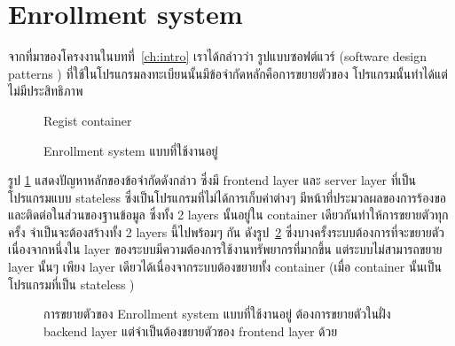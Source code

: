 \section {Enrollment system}

จากที่มาของโครงงานในบทที่~\ref{ch:intro} เราได้กล่าวว่า รูปแบบซอฟต์แวร์ (software design patterns \cite{sdp}) ที่ใช้ในโปรแกรมลงทะเบียนนั้นมีข้อจำกัดหลักคือการขยายตัวของ โปรแกรมนั้นทำได้แต่ไม่มีประสิทธิภาพ
%
\begin{figure}
    \centering
    \begin{center}
    Regist container \\
    \end{center}
    \caption[Poem]{Enrollment system แบบที่ใช้งานอยู่}
    \label{fig:old_regist_system}
\end{figure}
%
รูป \ref{fig:old_regist_system} แสดงปัญหาหลักของข้อจำกัดดังกล่าว ซึ่งมี frontend layer และ server layer ที่เป็นโปรแกรมแบบ stateless ซึ่งเป็นโปรแกรมที่ไม่ได้การเก็บค่าต่างๆ มีหน้าที่ประมวลผลของการร้องขอ และติดต่อในส่วนของฐานข้อมูล ซึ่งทั้ง 2 layers นั้นอยู่ใน container เดียวกันทำให้การขยายตัวทุกครั้ง จำเป็นจะต้องสร้างทั้ง 2 layers นี้ไปพร้อมๆ กัน ดังรูป~\ref{fig:scaling_old_regist_system} ซึ่งบางครั้งระบบต้องการที่จะขยายตัวเนื่องจากหนึ่งใน layer ของระบบมีความต้องการใช้งานทรัพยากรที่มากขึ้น แต่ระบบไม่สามารถขยาย layer นั้นๆ เพียง layer เดียวได้เนื่องจากระบบต้องขยายทั้ง container (เมื่อ container นั้นเป็นโปรแกรมที่เป็น stateless \cite{slsf})
%
\begin{figure}
    \centering
    \begin{center}
    \end{center}
    \caption[Poem]{การขยายตัวของ Enrollment system แบบที่ใช้งานอยู่ ต้องการขยายตัวในฝั่ง backend layer แต่จำเป็นต้องขยายตัวของ frontend layer ด้วย}
    \label{fig:scaling_old_regist_system}
\end{figure}
